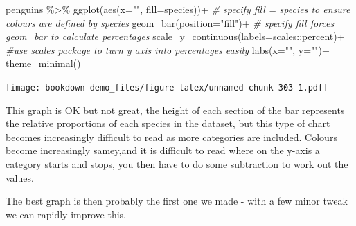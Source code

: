 \documentclass[
]{book}
\newenvironment{Shaded}{\begin{snugshade}}{\end{snugshade}}
\newcommand{\AttributeTok}[1]{\textcolor[rgb]{0.77,0.63,0.00}{#1}}
\newcommand{\CommentTok}[1]{\textcolor[rgb]{0.56,0.35,0.01}{\textit{#1}}}
\newcommand{\FunctionTok}[1]{\textcolor[rgb]{0.00,0.00,0.00}{#1}}
\newcommand{\NormalTok}[1]{#1}
\newcommand{\SpecialCharTok}[1]{\textcolor[rgb]{0.00,0.00,0.00}{#1}}
\newcommand{\StringTok}[1]{\textcolor[rgb]{0.31,0.60,0.02}{#1}}
\begin{document}
\begin{Shaded}
\begin{Highlighting}[]
\NormalTok{penguins }\SpecialCharTok{\%\textgreater{}\%} 
  \FunctionTok{ggplot}\NormalTok{(}\FunctionTok{aes}\NormalTok{(}\AttributeTok{x=}\StringTok{""}\NormalTok{,}
             \AttributeTok{fill=}\NormalTok{species))}\SpecialCharTok{+} \CommentTok{\# specify fill = species to ensure colours are defined by species}
  \FunctionTok{geom\_bar}\NormalTok{(}\AttributeTok{position=}\StringTok{"fill"}\NormalTok{)}\SpecialCharTok{+} \CommentTok{\# specify fill forces geom\_bar to calculate percentages}
  \FunctionTok{scale\_y\_continuous}\NormalTok{(}\AttributeTok{labels=}\NormalTok{scales}\SpecialCharTok{::}\NormalTok{percent)}\SpecialCharTok{+} \CommentTok{\#use scales package to turn y axis into percentages easily}
  \FunctionTok{labs}\NormalTok{(}\AttributeTok{x=}\StringTok{""}\NormalTok{,}
       \AttributeTok{y=}\StringTok{""}\NormalTok{)}\SpecialCharTok{+}
  \FunctionTok{theme\_minimal}\NormalTok{()}
\end{Highlighting}
\end{Shaded}

\texttt{[image: bookdown-demo\_files/figure-latex/unnamed-chunk-303-1.pdf]}

This graph is OK but not great, the height of each section of the bar represents the relative proportions of each species in the dataset, but this type of chart becomes increasingly difficult to read as more categories are included. Colours become increasingly samey,and it is difficult to read where on the y-axis a category starts and stops, you then have to do some subtraction to work out the values.

The best graph is then probably the first one we made - with a few minor tweak we can rapidly improve this.
\end{document}
